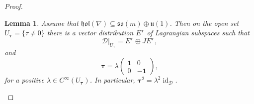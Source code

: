 \documentclass{amsart}
\theoremstyle{plain}
\newtheorem{lem}[theorem]{Lemma}
\theoremstyle{definition}
\newcommand{\id}{\operatorname{id}}
\def\so{\mathfrak{so}}
\def\u{\mathfrak{u}}
\newcommand{\hol}{\mathfrak{hol}}
\newcommand{\bt}{{\boldsymbol{\tau}}}
\newcommand{\1}{\mathbf{1}}
\newcommand{\D}{{\mathcal D}}
\newcommand{\E}{{E}}
\newcommand{\+}{\oplus}
\newcommand{\tcom}[1]{
 \marginpar{{\scriptsize  T: #1 }}}
\newcommand{\acom}[1]{
 \marginpar{{\scriptsize A: #1 }}}
\begin{document}
\begin{proof}
\begin{lem}\label{LetEbt} 
Assume that $\hol(\nabla)\subseteq\so(m)\oplus\u(1)$. Then on the open set $U_\bt=\{\tau\not=0\}$  there is  a vector distribution $\E^\bt$ of  Lagrangian subspaces such that 
\begin{equation}\label{DecDEbt}
	\D|_{U_\bt}=\E^{\bt}\oplus J\E^{\bt},\end{equation}
	and 
	$$\bt =\lambda\left( \begin{matrix} \1& 0\\0&-\1\end{matrix}\right),$$
	for a positive $\lambda\in C^\infty(U_\bt)$. In particular, 
	$\bt^2=\lambda^2\id_\D$. 
 \end{lem}




\end{proof}
\end{document}
